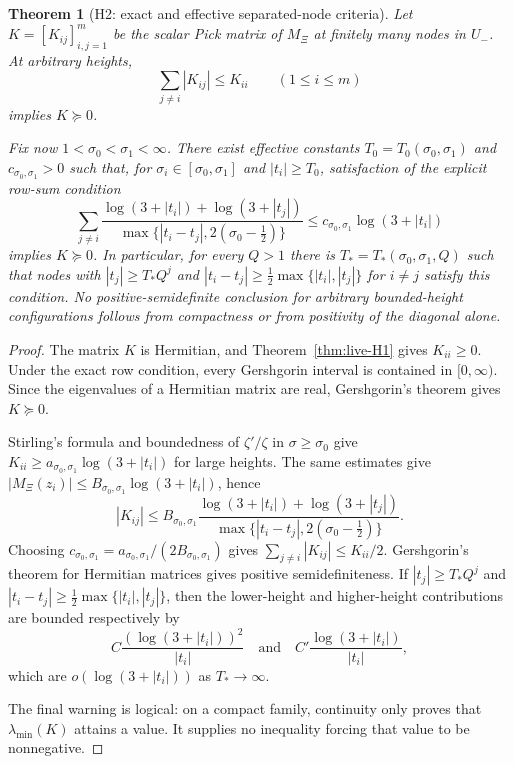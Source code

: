 \documentclass[11pt]{amsart}
\newtheorem{theorem}{Theorem}[section]
\theoremstyle{definition}
\theoremstyle{remark}
\theoremstyle{definition}
\newcommand{\half}{\tfrac{1}{2}}
\begin{document}
\begin{theorem}[H2: exact and effective separated-node criteria]\label{thm:live-H2}
Let $K=[K_{ij}]_{i,j=1}^m$ be the scalar Pick matrix of $M_\Xi$ at finitely many nodes in $U_-$.  At
arbitrary heights,
\[
   \sum_{j\ne i}|K_{ij}|\le K_{ii}\qquad(1\le i\le m)
\]
implies $K\succeq0$.

Fix now $1<\sigma_0<\sigma_1<\infty$.  There exist effective constants
$T_0=T_0(\sigma_0,\sigma_1)$ and $c_{\sigma_0,\sigma_1}>0$ such that, for
$\sigma_i\in[\sigma_0,\sigma_1]$ and $|t_i|\ge T_0$, satisfaction of the explicit row-sum condition
\[
   \sum_{j\ne i}
   \frac{\log(3+|t_i|)+\log(3+|t_j|)}
        {\max\{|t_i-t_j|,2(\sigma_0-\half)\}}
   \le c_{\sigma_0,\sigma_1}\log(3+|t_i|)
\]
implies $K\succeq0$.  In particular, for every $Q>1$ there is $T_*=T_*(\sigma_0,\sigma_1,Q)$ such
that nodes with $|t_j|\ge T_*Q^j$ and $|t_i-t_j|\ge\frac12\max\{|t_i|,|t_j|\}$ for $i\ne j$ satisfy
this condition.  No positive-semidefinite conclusion for arbitrary bounded-height configurations follows
from compactness or from positivity of the diagonal alone.
\end{theorem}

\begin{proof}
The matrix $K$ is Hermitian, and Theorem~\ref{thm:live-H1} gives $K_{ii}\ge0$.  Under the exact row
condition, every Gershgorin interval is contained in $[0,\infty)$.  Since the eigenvalues of a Hermitian
matrix are real, Gershgorin's theorem gives $K\succeq0$.

Stirling's formula and boundedness of $\zeta'/\zeta$ in $\sigma\ge\sigma_0$ give
$K_{ii}\ge a_{\sigma_0,\sigma_1}\log(3+|t_i|)$ for large heights.  The same estimates give
$|M_\Xi(z_i)|\le B_{\sigma_0,\sigma_1}\log(3+|t_i|)$, hence
\[
   |K_{ij}|\le
   B_{\sigma_0,\sigma_1}
   \frac{\log(3+|t_i|)+\log(3+|t_j|)}
        {\max\{|t_i-t_j|,2(\sigma_0-\half)\}}.
\]
Choosing $c_{\sigma_0,\sigma_1}=a_{\sigma_0,\sigma_1}/(2B_{\sigma_0,\sigma_1})$ gives
$\sum_{j\ne i}|K_{ij}|\le K_{ii}/2$.  Gershgorin's theorem for Hermitian matrices gives positive
semidefiniteness.  If $|t_j|\ge T_*Q^j$ and
$|t_i-t_j|\ge\frac12\max\{|t_i|,|t_j|\}$, then the lower-height and higher-height contributions are
bounded respectively by
\[
   C\frac{(\log(3+|t_i|))^2}{|t_i|}
   \quad\text{and}\quad
   C'\frac{\log(3+|t_i|)}{|t_i|},
\]
which are $o(\log(3+|t_i|))$ as $T_*\to\infty$.

The final warning is logical: on a compact family, continuity only proves that $\lambda_{\min}(K)$
attains a value.  It supplies no inequality forcing that value to be nonnegative.
\end{proof}
\end{document}
